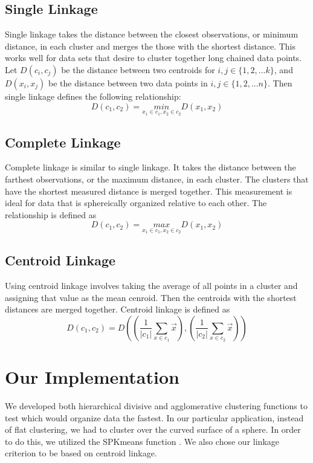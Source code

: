 \documentclass[../tech_report_1.tex]{subfiles}
\begin{document}
\subsection*{Single Linkage}

Single linkage takes the distance between the closest observations,
or minimum distance, in each cluster and merges the those with the
shortest distance. This works well for data sets that desire to cluster
together long chained data points. Let $D(c_i,c_j)$ be the distance between two centroids for $i,j \in \{1, 2, ... k\}$, and $D(x_i, x_j)$ be the distance between two data points in $i, j \in \{ 1, 2, ... n \}$. Then single linkage defines the following relationship:
\[
D(c_{1},c_{2})=\underset{x_{1}\in c_{1},x_{2}\in c_{2}}{min}D(x_{1},x_{2})
\]



\subsection*{Complete Linkage}

Complete linkage is similar to single linkage. It takes the distance
between the farthest observations, or the maximum distance, in each
cluster. The clusters that have the shortest measured distance is
merged together. This measurement is ideal for data that is sphereically
organized relative to each other. The relationship is defined as
\[
D(c_{1},c_{2})=\underset{x_{1}\in c_{1},x_{2}\in c_{2}}{max}D(x_{1},x_{2})
\]



\subsection*{Centroid Linkage}

Using centroid linkage involves taking the average of all points in
a cluster and assigning that value as the mean cenroid. Then
the centroids with the shortest distances are merged together.
Centroid linkage is defined as
\[
D(c_{1},c_{2})=D((\frac{1}{|c_{1}|}\sum_{x\in c_{1}}\overset{\rightarrow}{x}),(\frac{1}{|c_{2}|}\sum_{x\in c_{2}}\overset{\rightarrow}{x}))
\]



\section*{Our Implementation}

We developed both hierarchical divisive and agglomerative clustering
functions to test which would organize data the fastest. In our particular
application, instead of flat clustering, we had to cluster over the
curved surface of a sphere. In order to do this, we utilized the SPKmeans
function \cite{SphericalKMeans}. We also chose our linkage criterion
to be based on centroid linkage.
\end{document}
